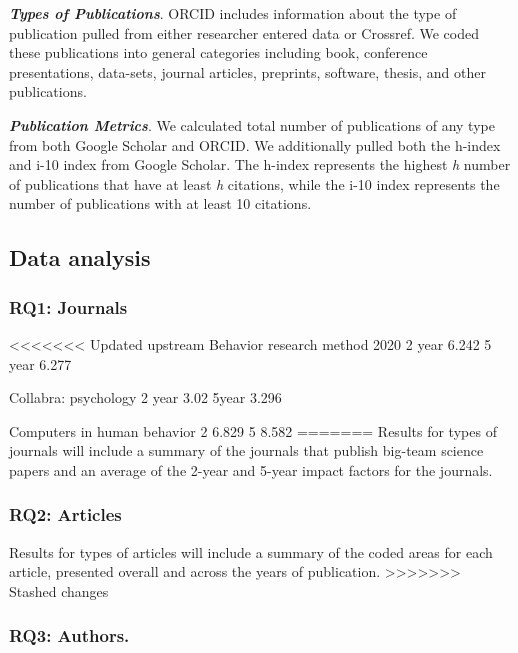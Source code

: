 \documentclass[
  english,
  man]{apa6}
\begin{document}
\textbf{\emph{Types of Publications}}. ORCID includes information about the type of publication pulled from either researcher entered data or Crossref. We coded these publications into general categories including book, conference presentations, data-sets, journal articles, preprints, software, thesis, and other publications.

\textbf{\emph{Publication Metrics}}. We calculated total number of publications of any type from both Google Scholar and ORCID. We additionally pulled both the h-index and i-10 index from Google Scholar. The h-index represents the highest \emph{h} number of publications that have at least \emph{h} citations, while the i-10 index represents the number of publications with at least 10 citations.

\hypertarget{data-analysis}{%
\subsection{Data analysis}\label{data-analysis}}

\hypertarget{rq1-journals}{%
\subsubsection{RQ1: Journals}\label{rq1-journals}}

<<<<<<< Updated upstream
Behavior research method 2020
2 year 6.242
5 year 6.277

Collabra: psychology 
2 year 3.02
5year 3.296

Computers in human behavior
2 6.829
5 8.582
=======
Results for types of journals will include a summary of the journals that publish big-team science papers and an average of the 2-year and 5-year impact factors for the journals.

\hypertarget{rq2-articles}{%
\subsubsection{RQ2: Articles}\label{rq2-articles}}

Results for types of articles will include a summary of the coded areas for each article, presented overall and across the years of publication.
>>>>>>> Stashed changes

\hypertarget{rq3-authors.}{%
\subsubsection{\texorpdfstring{RQ3: Authors.\\
}{RQ3: Authors. }}\label{rq3-authors.}}
\end{document}
